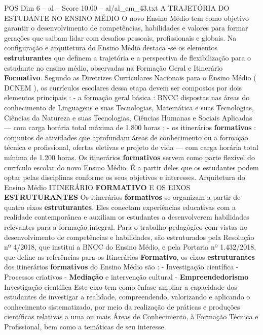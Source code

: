 \begin{textsample}{POS Dim 6 – al – Score 10.00 – al/al\_em\_43.txt}  \label{ex:f6_pos_222}
A TRAJETÓRIA DO ESTUDANTE NO ENSINO MÉDIO O novo Ensino Médio tem como objetivo garantir o desenvolvimento de competências, habilidades e valores para formar gerações que saibam lidar com desafios pessoais, profissionais e globais.
Na configuração e arquitetura do Ensino Médio destaca -se os elementos \textbf{estruturantes} que definem a trajetória e a perspectiva de flexibilização para o estudante no ensino médio, observadas na Formação Geral e Itinerário \textbf{Formativo}.
Segundo as Diretrizes Curriculares Nacionais para o Ensino Médio ( DCNEM ), os currículos escolares dessa etapa devem ser compostos por dois elementos principais : - a formação geral básica : BNCC dispostas nas áreas do conhecimento de Linguagens e suas Tecnologias, Matemática e suas Tecnologias, Ciências da Natureza e suas Tecnologias, Ciências Humanas e Sociais Aplicadas — com carga horária total máxima de 1.800 horas ; - os itinerários \textbf{formativos} : conjuntos de atividades que aprofundam áreas de conhecimento ou a formação técnica e profissional, ofertas eletivas e projeto de vida — com carga horária total mínima de 1.200 horas.
Os itinerários \textbf{formativos} servem como parte flexível do currículo escolar do novo Ensino Médio.
É a partir deles que os estudantes podem optar pelas disciplinas conforme os seus objetivos e interesses.
Arquitetura do Ensino Médio ITINERÁRIO \textbf{FORMATIVO} E OS EIXOS \textbf{ESTRUTURANTES} Os itinerários \textbf{formativos} se organizam a partir de quatro eixos \textbf{estruturantes}.
Eles conectam experiências educativas com a realidade contemporânea e auxiliam os estudantes a desenvolverem habilidades relevantes para a formação integral.
Para o trabalho pedagógico com vistas no desenvolvimento de competências e habilidades, são estruturados pela Resolução nº 4/2018, que institui a BNCC do Ensino Médio, e pela Portaria nº 1.432/2018, que define as referências para os Itinerários \textbf{Formativo}, os eixos \textbf{estruturantes} dos itinerários \textbf{formativos} do Ensino Médio são : - Investigação científica - Processos criativos - \textbf{Mediação} e intervenção cultural - \textbf{Empreendedorismo} Investigação científica Este eixo tem como ênfase ampliar a capacidade dos estudantes de investigar a realidade, compreendendo, valorizando e aplicando o conhecimento sistematizado, por meio da realização de práticas e produções científicas relativas a uma ou mais Áreas de Conhecimento, à Formação Técnica e Profissional, bem como a temáticas de seu interesse.

\end{textsample}
